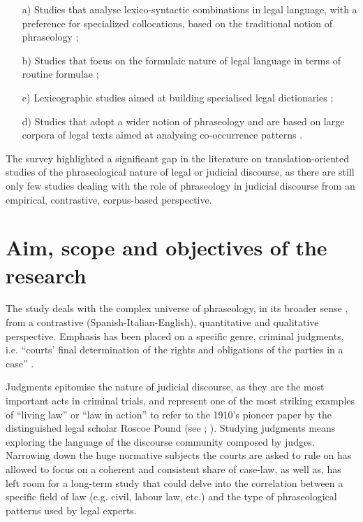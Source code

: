 \documentclass[output=paper]{LSP/langsci}
\begin{document}
\begin{enumerate}
\item[a)] Studies that analyse lexico-syntactic combinations in legal language, with a preference for specialized collocations, based on the traditional notion of phraseology \citep{Benson1986,Hausmann1989,Corpas1996,Berdychowska1999, Nardon2002,Lombardi2004,Rovere1999,Nystedt2000,Cruz2002,Giráldez2007,
Anderson2006,Montenegro2007,Biel2011,Bhatia2004};      
\item[b)] Studies that focus on the formulaic nature of legal language in terms of routine formulae \citep{Rega2000,Bachmann2000,Monzo2001,Carvalho2007,Giurizzato2008};
\item[c)] Lexicographic studies aimed at building specialised legal dictionaries \citep{Groot1999,François1997,Gisbert2008,Fernández2008};
\item[d)] Studies that adopt a wider notion of phraseology and are based on large corpora of legal texts aimed at analysing co-occurrence patterns \citep{Mazzi2005,Mazzi2010,GozdzRoszkowski2011}.
\end{enumerate}

The survey highlighted a significant gap in the literature on translation-oriented studies of the phraseological nature of legal or judicial discourse, as there are still only few studies dealing with the role of phraseology in judicial discourse from an empirical, contrastive, corpus-based perspective. 

\section{Aim, scope and objectives of the research}
The study deals with the complex universe of phraseology, in its broader sense \citep[see][6]{Gries2008}, from a contrastive (Spanish-Italian-English), quantitative and qualitative perspective. Emphasis has been placed on a specific genre, criminal judgments, i.e. “courts’ final determination of the rights and obligations of the parties in a case” \citep[see][918]{Bryan2009}.

Judgments epitomise the nature of judicial discourse, as they are the most important acts in criminal trials, and represent one of the most striking examples of “living law” or “law in action” to refer to the 1910’s pioneer paper by the distinguished legal scholar Roscoe Pound (see \citealt[154]{Garavelli2010}; \citealt[253]{Cadoppi1999}). Studying judgments means exploring the language of the discourse community composed by judges. Narrowing down the huge normative subjects the courts are asked to rule on has allowed to focus on a coherent and consistent share of case-law, as well as, has left room for a long-term study that could delve into the correlation between a specific field of law (e.g. civil, labour law, etc.) and the type of phraseological patterns used by legal experts.
\end{document}
